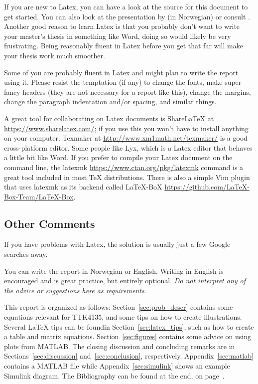 If you are new to Latex, you can have a look at the source for this document to get started. You can also look at the presentation by \cite{Berland2010} (in Norwegian) or consult \cite{Oetiker2011}. Another good reason to learn Latex is that you probably don't want to write your master's thesis in something like Word, doing so would likely be very frustrating. Being reasonably fluent in Latex before you get that far will make your thesis work much smoother.

Some of you are probably fluent in Latex and might plan to write the report using it. Please resist the temptation (if any) to change the fonts, make super fancy headers (they are not necessary for a report like this), change the margins, change the paragraph indentation and/or spacing, and similar things.

A great tool for collaborating on Latex documents is ShareLaTeX at \url{https://www.sharelatex.com/}; if you use this you won't have to install anything on your computer. Texmaker at \url{http://www.xm1math.net/texmaker/} is a good cross-platform editor. Some people like Lyx, which is a Latex editor that behaves a little bit like Word. If you prefer to compile your Latex document on the command line, the latexmk \url{https://www.ctan.org/pkg/latexmk} command is a great tool included in most TeX distributions. There is also a simple Vim plugin that uses latexmk as its backend called LaTeX-BoX \url{https://github.com/LaTeX-Box-Team/LaTeX-Box}.

\subsection{Other Comments}
If you have problems with Latex, the solution is usually just a few Google searches away.

You can write the report in Norwegian or English. Writing in English is encouraged and is great practice, but entirely optional. \emph{Do not interpret any of the advice or suggestions here as requirements.}

This report is organized as follows: Section~\ref{sec:prob_descr} contains some equations relevant for TTK4135, and some tips on how to create illustrations. Several \LaTeX{} tips can be foundin Section~\ref{sec:latex_tips}, such as how to create a table and matrix equations. Section~\ref{sec:figures} contains some advice on using plots from MATLAB\@. The closing discussion and concluding remarks are in Sections~\ref{sec:discussion} and~\ref{sec:conclusion}, respectively. Appendix~\ref{sec:matlab} contains a MATLAB file while Appendix~\ref{sec:simulink} shows an example Simulink diagram. The Bibliography can be found at the end, on page~\pageref{sec:bibliography}.
